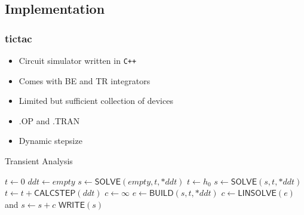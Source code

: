 \subsection{Implementation}

\begin{frame}
\frametitle{tictac}
\begin{itemize}[<+->]
    \item Circuit simulator written in \texttt{C++}
    \item Comes with BE and TR integrators
    \item Limited but sufficient collection of devices
    \item .OP and .TRAN
    \item Dynamic stepsize
\end{itemize}
\end{frame}

\begin{frame}
    \begin{algorithm}[H]
        \caption{Transient Analysis}
        \begin{algorithmic}[1]
                \State $t \gets 0$
                \State $ddt \gets empty$ 
                \State $s \gets \textsf{SOLVE}(empty,t,*ddt)$ 
                \State $t \gets h_0$
                    \State $s \gets \textsf{SOLVE}(s,t,*ddt)$
                    \State $t \gets t + \textsf{CALCSTEP}(ddt)$
                \EndWhile
            \EndProcedure
                \State $c \gets \infty$
                    \State $e \gets \textsf{BUILD}(s,t,*ddt)$
                    \State $c \gets \textsf{LINSOLVE}(e)$ and $s \gets s + c$
                \EndWhile
                \State $\textsf{WRITE}(s)$
            \EndProcedure
        \end{algorithmic}
      \end{algorithm}
\end{frame}


